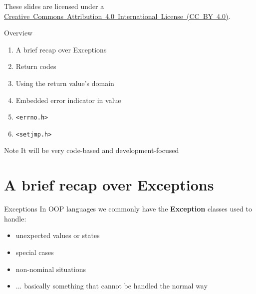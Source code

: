 \documentclass[aspectratio=169,14pt]{beamer}
\begin{document}
\begin{frame}
\titlepage

\begin{center}
    \begin{footnotesize}
    These slides are licensed under a \href{https://creativecommons.org/licenses/by/4.0/}{Creative~Commons~Attribution~4.0~International~License~(CC~BY~4.0)}.
    \end{footnotesize}
\end{center}
\end{frame}



\begin{frame}{Overview}
\begin{enumerate}
    \item A brief recap over Exceptions
    \item Return codes
    \item Using the return value's domain
    \item Embedded error indicator in value
    \item \texttt{<errno.h>}
    \item \texttt{<setjmp.h>}
\end{enumerate}

\begin{block}{Note}
It will be very code-based and development-focused
\end{block}
\end{frame}





\section{A brief recap over Exceptions}

\begin{frame}{Exceptions}
In OOP languages we commonly have the \textbf{Exception} classes used to handle:
\begin{itemize}
    \item unexpected values or states
    \item special cases
    \item non-nominal situations
    \item ... basically something that cannot be handled the normal way
\end{itemize}
\end{frame}
\end{document}
